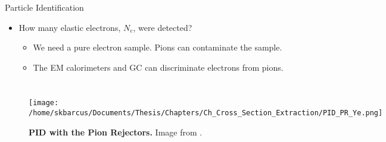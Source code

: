 \documentclass[10pt]{beamer}
\begin{document}
\begin{frame}[fragile]{Particle Identification}
	\begin{itemize}
		\item How many elastic electrons, \alert{$N_e$}, were detected? 
			\begin{itemize}
				\item[--] We need a pure electron sample. Pions can contaminate the sample.
				\pause
				\item[--] The \alert{EM calorimeters} and \alert{GC} can discriminate electrons from pions.
			\end{itemize}
	\end{itemize}
	
	\pause
	\begin{columns}[T,onlytextwidth]   	
	
	\begin{figure}[!ht]
	\begin{center}
	\texttt{[image: /home/skbarcus/Documents/Thesis/Chapters/Ch\_Cross\_Section\_Extraction/PID\_PR\_Ye.png]}
	\end{center}
	\caption{
	{\bf{PID with the Pion Rejectors.}} Image from \cite{Thesis:Ye}.}%
	\label{fig:pid_pr_ye}
	\end{figure}
	
	
	\vspace{8mm}
	
	\begin{figure}[!ht]
	\begin{center}
	\texttt{[image: /home/skbarcus/Documents/Thesis/Chapters/Ch\_Cross\_Section\_Extraction/PID\_GC\_Ye.png]}
	\end{center}
	\caption{
	{\bf{PID with the Gas Cherenkov.}} Image from \cite{Thesis:Ye}.}%
	\label{fig:pid_gc_ye}
	\end{figure}

	\end{columns}
\end{frame}
\end{document}
